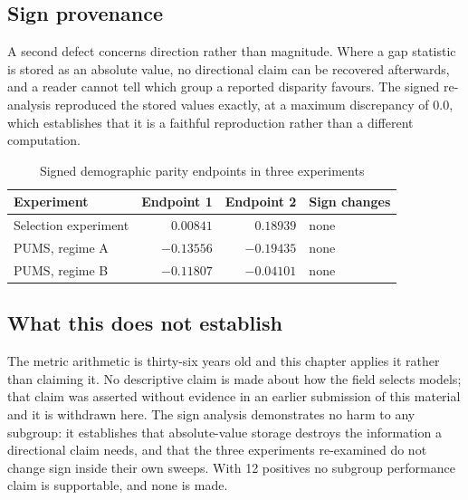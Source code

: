 \subsection{Sign provenance}

A second defect concerns direction rather than magnitude. Where a gap statistic
is stored as an absolute value, no directional claim can be recovered afterwards,
and a reader cannot tell which group a reported disparity favours. The signed
re-analysis reproduced the stored values exactly, at a maximum discrepancy of
$0.0$, which establishes that it is a faithful reproduction rather than a
different computation.

\begin{table}[H]
\caption{Signed demographic parity endpoints in three experiments}
\centering
\small
\begin{tabular}{lrrl}
\toprule
\textbf{Experiment} & \textbf{Endpoint 1} & \textbf{Endpoint 2} &
\textbf{Sign changes} \\
\midrule
Selection experiment & $0.00841$  & $0.18939$  & none \\
PUMS, regime A       & $-0.13556$ & $-0.19435$ & none \\
PUMS, regime B       & $-0.11807$ & $-0.04101$ & none \\
\bottomrule
\end{tabular}
\label{tab:signed}
\end{table}

\subsection{What this does not establish}

The metric arithmetic is thirty-six years old \citep{feinstein1990paradoxes} and this
chapter applies it rather than claiming it. No descriptive claim is made about
how the field selects models; that claim was asserted without evidence in an
earlier submission of this material and it is withdrawn here. The sign analysis
demonstrates no harm to any subgroup: it establishes that absolute-value storage
destroys the information a directional claim needs, and that the three
experiments re-examined do not change sign inside their own sweeps. With 12
positives no subgroup performance claim is supportable, and none is made.

